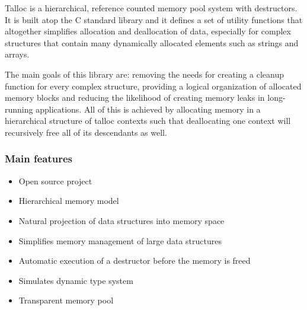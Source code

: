 Talloc is a hierarchical, reference counted memory pool system with destructors.
It is built atop the C standard library and it defines a set of utility
functions that altogether simplifies allocation and deallocation of data,
especially for complex structures that contain many dynamically allocated
elements such as strings and arrays.

The main goals of this library are: removing the needs for creating a cleanup
function for every complex structure, providing a logical organization of
allocated memory blocks and reducing the likelihood of creating memory leaks in
long-running applications. All of this is achieved by allocating memory in a
hierarchical structure of talloc contexts such that deallocating one context
will recursively free all of its descendants as well.

\subsubsection{Main features}
\begin{itemize}
  \item Open source project
  \item Hierarchical memory model
  \item Natural projection of data structures into memory space
  \item Simplifies memory management of large data structures
  \item Automatic execution of a destructor before the memory is freed
  \item Simulates dynamic type system
  \item Transparent memory pool
\end{itemize}
